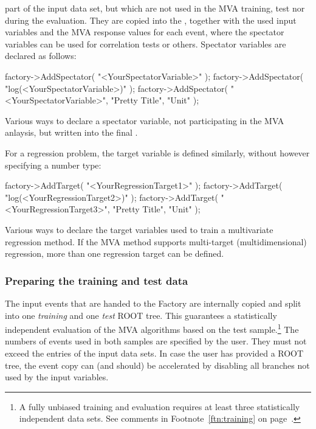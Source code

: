 part of the input data set, but which are not used in the MVA training, test nor during 
the evaluation. They are copied into the , together with the used input 
variables and the MVA response values for each event, where the spectator variables can 
be used for correlation tests or others. Spectator variables are declared as follows:
\begin{codeexample}
\begin{tmvacode}
factory->AddSpectator( "<YourSpectatorVariable>" );
factory->AddSpectator( "log(<YourSpectatorVariable>)" );
factory->AddSpectator( "<YourSpectatorVariable>", "Pretty Title", "Unit" );
\end{tmvacode}
\caption[.]{\codeexampleCaptionSize Various ways to declare a spectator variable, not 
            participating in the MVA anlaysis, but written into the final .
}
\end{codeexample}
For a regression problem, the target variable is defined similarly, without however 
specifying a number type:
\begin{codeexample}
\begin{tmvacode}
factory->AddTarget( "<YourRegressionTarget1>" );
factory->AddTarget( "log(<YourRegressionTarget2>)" );
factory->AddTarget( "<YourRegressionTarget3>", "Pretty Title", "Unit" );
\end{tmvacode}
\caption[.]{\codeexampleCaptionSize Various ways to declare the target variables used 
            to train a multivariate regression method. If the MVA method supports 
            multi-target (multidimensional) 
            regression, 
            more than one regression target can be defined. 
}
\end{codeexample}

\subsubsection{Preparing the training and test 
               data}
\label{sec:PreparingTrainingTestData}

The input events that are handed to the Factory are internally copied
and split into one {\em training} and one {\em test} ROOT tree. This
guarantees a statistically independent evaluation of the MVA
algorithms based on the test sample.\footnote { A fully unbiased
  training and evaluation requires at least three statistically
  independent data sets. See comments in Footnote~\ref{ftn:training}
  on page~\pageref{ftn:training}.  } The numbers of events used in
both samples are specified by the user. They must not exceed the
entries of the input data sets. In case the user has provided a ROOT
tree, the event copy can (and should) be accelerated by disabling all
branches not used by the input variables.

